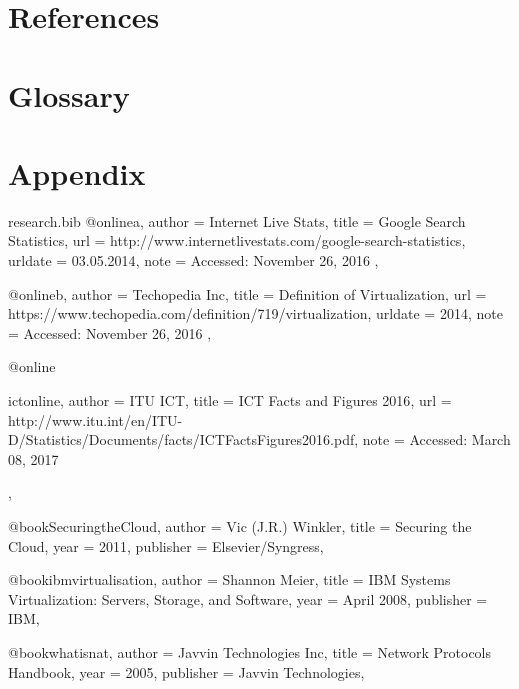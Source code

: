\documentclass{article}
\begin{document}
  \newpage
  \section{References}
	
	\renewcommand{\bibname}{}
  \section{Glossary}
  	\printglossary
  \newpage
  \section{Appendix}

	

	\begin{filecontents*}{research.bib}
		@online{a,
			author = {Internet Live Stats},
			title = {Google Search Statistics},
			url = {http://www.internetlivestats.com/google-search-statistics},
			urldate = {03.05.2014},
			note = {Accessed: November 26, 2016}
		},
	
		@online{b,
			author = {Techopedia Inc},
			title = {Definition of Virtualization},
			url = {https://www.techopedia.com/definition/719/virtualization},
			urldate = {2014},
			note = {Accessed: November 26, 2016}
		},
	
		@online{ictonline,
			author = {ITU ICT},
			title = {ICT Facts and Figures 2016},
			url = {http://www.itu.int/en/ITU-D/Statistics/Documents/facts/ICTFactsFigures2016.pdf},
			note = {Accessed: March 08, 2017}

		},
	
		@book{SecuringtheCloud,
			author    = {Vic (J.R.) Winkler},
			title     = {Securing the Cloud},
			year      = {2011},
			publisher = {Elsevier/Syngress},
		}
	
		@book{ibmvirtualisation,
			author    = {Shannon Meier},
			title     = {IBM Systems Virtualization: Servers, Storage, and Software},
			year      = {April 2008},
			publisher = {IBM},
		}
	
	    @book{whatisnat,
			author    = {Javvin Technologies Inc},
			title     = {Network Protocols Handbook},
			year      = {2005},
			publisher = {Javvin Technologies},
		}

		
	\end{filecontents*}

	
\end{document}
